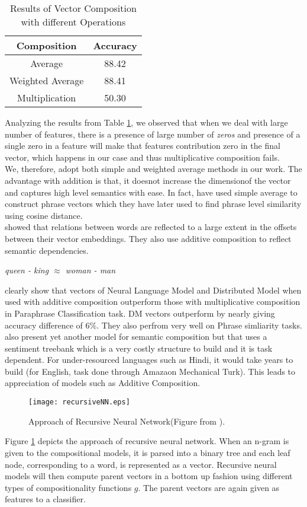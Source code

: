 \begin {table}[h!]
\centering
\begin{tabular}{ |c|c| }
\hline
Composition & Accuracy \\ \hline \hline
Average & 88.42 \\ \hline
Weighted Average & 88.41 \\ \hline
Multiplication & 50.30 \\ \hline
\end{tabular}
\caption {Results of Vector Composition with different Operations}
\label{table:composition}
\end{table}
Analyzing the results from Table \ref{table:composition}, we observed that when we deal with large number of features, there is a presence of large number of \emph{zeros} and presence of a single zero in a feature will make that features contribution zero in the final vector, which happens in our case and thus multiplicative composition fails.\\
We, therefore, adopt both simple and weighted average methods in our work. The advantage with addition is that, it doesnot increase the dimensionof the vector and captures high level semantics with ease. In fact, \cite{Zou:13} have used simple average to construct phrase vectors which they have later used to find phrase level similarity using cosine distance.\\
\cite{Mikolov:13c} showed that relations between words are reflected to a large extent in the offsets between their vector embeddings. They also use additive composition to reflect semantic dependencies.
\begin{center}
\emph{queen - king $\approx$ woman - man}
\end{center}
\cite{Blacoe:12} clearly show that vectors of Neural Language Model and Distributed Model when used with additive composition outperform those with multiplicative composition in Paraphrase Classification task. DM vectors outperform by nearly giving accuracy difference of 6\%. They also perfrom very well on Phrase simliarity tasks.\\
\cite{Socher:13} also present yet another model for semantic composition but that uses a sentiment treebank which is a very costly structure to build and it is task dependent. For under-resourced languages such as Hindi, it would take years to build (for English, task done through Amazaon Mechanical Turk). This leads to appreciation of models such as Additive Composition.\\
\begin{figure}[ht!]
\centering
\texttt{[image: recursiveNN.eps]}
\caption{Approach of Recursive Neural Network(Figure from \cite{Socher:13}). \label{fig:recursiveNN}}
\end{figure}
Figure \ref{fig:recursiveNN} depicts the approach of recursive neural network. When an n-gram is given to the compositional models, it is parsed into a binary tree and each leaf node, corresponding to a word, is represented as a vector. Recursive neural models will then  compute parent vectors in a bottom up fashion using different types of compositionality functions $g$. The parent vectors are again given as features to a classifier.

